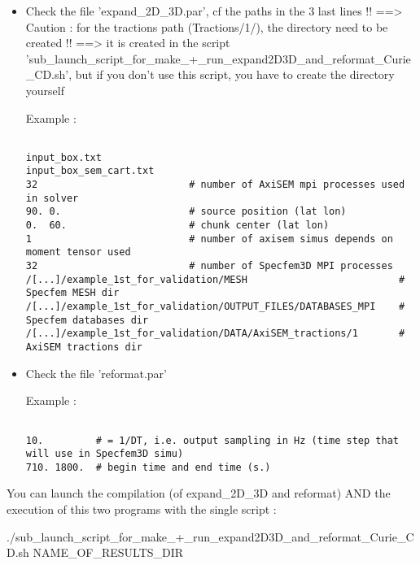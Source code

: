 \documentclass[11pt]{article}
\begin{document}
\begin{itemize}

\item[\textbullet] Check the file 'expand\_2D\_3D.par', cf the paths in the 3 last lines !! ==> Caution : for the tractions path (Tractions/1/), the directory need to be created !! ==> it is created in the script 'sub\_launch\_script\_for\_make\_+\_run\_expand2D3D\_and\_reformat\_Curie\_CD.sh', but if you don't use this script, you have to create the directory yourself

\smallskip

\noindent Example :
\begin{verbatim}

input_box.txt
input_box_sem_cart.txt
32                          # number of AxiSEM mpi processes used in solver
90. 0.                      # source position (lat lon)
0.  60.                     # chunk center (lat lon)
1                           # number of axisem simus depends on moment tensor used
32                          # number of Specfem3D MPI processes
/[...]/example_1st_for_validation/MESH                          # Specfem MESH dir
/[...]/example_1st_for_validation/OUTPUT_FILES/DATABASES_MPI    # Specfem databases dir
/[...]/example_1st_for_validation/DATA/AxiSEM_tractions/1       # AxiSEM tractions dir

\end{verbatim}

\item[\textbullet] Check the file 'reformat.par'

\smallskip

\noindent Example :
\begin{verbatim}

10.         # = 1/DT, i.e. output sampling in Hz (time step that will use in Specfem3D simu) 
710. 1800.  # begin time and end time (s.)

\end{verbatim}

\end{itemize}

\medskip

\noindent You can launch the compilation (of expand\_2D\_3D and reformat) AND the execution of this two programs with the single script :

\smallskip

\noindent ./sub\_launch\_script\_for\_make\_+\_run\_expand2D3D\_and\_reformat\_Curie\_CD.sh NAME\_OF\_RESULTS\_DIR

\medskip
\end{document}
